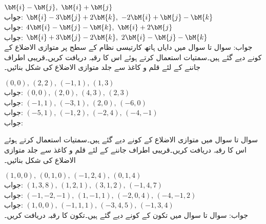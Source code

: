 \quad
$\bM{i}-\bM{j},\,\, \bM{i}+\bM{j}$\\
جواب:
\quad
$\bM{i}-3\bM{j}+2\bM{k},\,\, -2\bM{i}+\bM{j}-\bM{k}$\\
جواب:
\quad
$4\bM{i}-\bM{j}-\bM{k},\,\, \bM{i}+2\bM{j}$\\
جواب:
\quad
$\bM{i}+3\bM{j}-2\bM{k},\,\, 2\bM{i}-\bM{j}-\bM{k}$\\
جواب:
سوال  تا سوال  میں دایاں ہاتھ کارتیسی نظام کے  سطح پر متوازی الاضلاع کے کونے دیے گئے ہیں۔سمتیات استعمال کرتے ہوئے اس کا رقبہ دریافت کریں۔قریبی اطراف جاننے کے لئے قلم و کاغذ سے  جلد متوازی الاضلاع کی شکل بنائیں۔

\quad
$(0,0), \, (2,2), \, (-1,1), \, (1,3)$\\
جواب:
\quad
$(0,0),\, (2,0),\, (4,3),\,(2,3)$\\
جواب:
\quad
$(-1,1), \, (-3,1), \, (2,0), \, (-6,0)$\\
جواب:
\quad
$(-5,1), \, (-1,2), \, (-2,4), \, (-4,-1)$\\
جواب:

سوال  تا سوال  میں متوازی الاضلاع کے کونے دیے گئے ہیں۔سمتیات استعمال کرتے ہوئے اس کا رقبہ دریافت کریں۔قریبی اطراف جاننے کے لئے قلم و کاغذ سے  جلد متوازی الاضلاع کی شکل بنائیں۔

\quad
$(1,0,0), \, (0,1,0),\, (-1,2,4), \, (0,1,4)$\\
جواب:
\quad
$(1,3,8), \, (1,2,1),\, (3,1,2), \, (-1,4,7)$\\
جواب:
\quad
$(-1,-2,-1), \, (1,-1,1),\, (-2,0,4), \, (-4,-1,2)$\\
جواب:
\quad
$(1,0,0), \, (-1,1,1),\, (-3,4,5), \, (-1,3,4)$\\
جواب:
سوال  تا سوال  میں تکون کے کونے دیے گئے ہیں۔تکون کا رقبہ دریافت کریں۔

